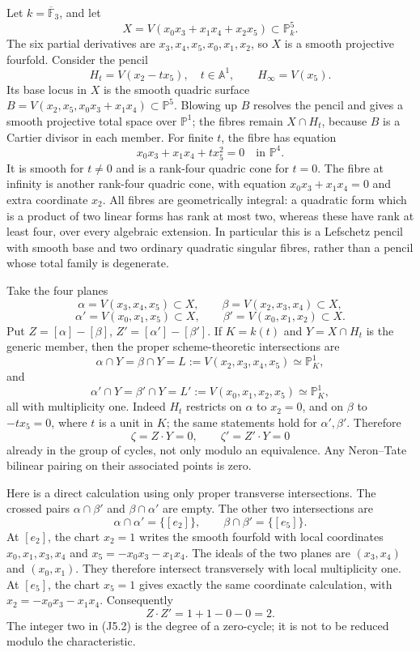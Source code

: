 Let $k=\overline{\mathbb F}_3$, and let
\[
 X=V(x_0x_3+x_1x_4+x_2x_5)\subset\mathbb P^5_k.
\]
The six partial derivatives are $x_3,x_4,x_5,x_0,x_1,x_2$,
so $X$ is a smooth projective fourfold. Consider the pencil
\[
 H_t=V(x_2-tx_5),\quad t\in\mathbb A^1,
 \qquad H_\infty=V(x_5).
\]
Its base locus in $X$ is the smooth quadric surface
$B=V(x_2,x_5,x_0x_3+x_1x_4)\subset\mathbb P^5$.
Blowing up $B$ resolves the pencil and gives a smooth projective
total space over $\mathbb P^1$; the fibres remain $X\cap H_t$,
because $B$ is a Cartier divisor in each member. For finite $t$,
the fibre has equation
\[
                 x_0x_3+x_1x_4+t x_5^2=0
                 \quad\text{in }\mathbb P^4.
\]
It is smooth for $t\ne0$ and is a rank-four quadric cone for $t=0$.
The fibre at infinity is another rank-four quadric cone, with
equation $x_0x_3+x_1x_4=0$ and extra coordinate $x_2$.
All fibres are geometrically integral: a quadratic form which is
a product of two linear forms has rank at most two, whereas these
have rank at least four, over every algebraic extension.
In particular this is a Lefschetz pencil with smooth base and two
ordinary quadratic singular fibres, rather than a pencil whose
total family is degenerate.

Take the four planes
\[
 \alpha=V(x_3,x_4,x_5)\subset X,
 \qquad
 \beta=V(x_2,x_3,x_4)\subset X,
\]
\[
 \alpha'=V(x_0,x_1,x_5)\subset X,
 \qquad
 \beta'=V(x_0,x_1,x_2)\subset X.
\]
Put $Z=[\alpha]-[\beta]$, $Z'=[\alpha']-[\beta']$.
If $K=k(t)$ and $Y=X\cap H_t$ is the generic
member, then the proper scheme-theoretic intersections are
\[
 \alpha\cap Y=\beta\cap Y
   =L:=V(x_2,x_3,x_4,x_5)\simeq\mathbb P^1_K,
\]
and
\[
 \alpha'\cap Y=\beta'\cap Y
   =L':=V(x_0,x_1,x_2,x_5)\simeq\mathbb P^1_K,
\]
all with multiplicity one. Indeed $H_t$ restricts on $\alpha$
to $x_2=0$, and on $\beta$ to $-t x_5=0$, where $t$ is a unit
in $K$; the same statements hold for $\alpha',\beta'$.
Therefore
\[
                  \zeta=Z\cdot Y=0,
                  \qquad \zeta'=Z'\cdot Y=0             \tag{J5.1}
\]
already in the group of cycles, not only modulo an equivalence.
Any Neron--Tate bilinear pairing on their associated points is zero.

Here is a direct calculation using only proper transverse
intersections. The crossed pairs $\alpha\cap\beta'$ and
$\beta\cap\alpha'$ are empty. The other two intersections are
\[
 \alpha\cap\alpha'=\{[e_2]\},\qquad
 \beta\cap\beta'=\{[e_5]\}.
\]
At $[e_2]$, the chart $x_2=1$ writes the smooth fourfold with local
coordinates $x_0,x_1,x_3,x_4$ and
$x_5=-x_0x_3-x_1x_4$. The ideals of the two planes are
$(x_3,x_4)$ and $(x_0,x_1)$. They therefore intersect transversely
with local multiplicity one. At $[e_5]$, the chart $x_5=1$
gives exactly the same coordinate calculation, with
$x_2=-x_0x_3-x_1x_4$. Consequently
\[
                  Z\cdot Z'=1+1-0-0=2.                 \tag{J5.2}
\]
The integer two in (J5.2) is the degree of a zero-cycle; it is not
to be reduced modulo the characteristic.

